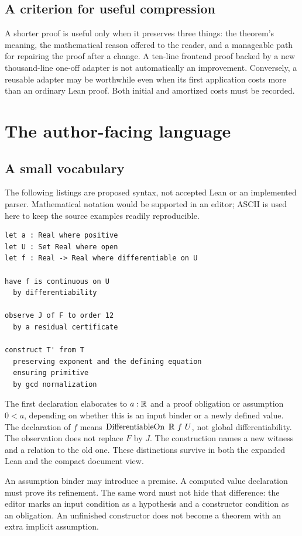 \documentclass[11pt,a4paper]{article}
\newcommand{\code}[1]{\texttt{\detokenize{#1}}}
\theoremstyle{plain}\newtheorem{proposition}{Proposition}[section]
\theoremstyle{definition}\newtheorem{definition}[proposition]{Definition}
\theoremstyle{remark}\newtheorem{remark}[proposition]{Remark}
\begin{document}
\subsection{A criterion for useful compression}
A shorter proof is useful only when it preserves three things: the theorem's meaning, the mathematical reason offered to the reader, and a manageable path for repairing the proof after a change. A ten-line frontend proof backed by a new thousand-line one-off adapter is not automatically an improvement. Conversely, a reusable adapter may be worthwhile even when its first application costs more than an ordinary Lean proof. Both initial and amortized costs must be recorded.

\section{The author-facing language}\label{sec:surface}
\subsection{A small vocabulary}
The following listings are proposed syntax, not accepted Lean or an implemented parser. Mathematical notation would be supported in an editor; ASCII is used here to keep the source examples readily reproducible.

\begin{lstlisting}
let a : Real where positive
let U : Set Real where open
let f : Real -> Real where differentiable on U

have f is continuous on U
  by differentiability

observe J of F to order 12
  by a residual certificate

construct T' from T
  preserving exponent and the defining equation
  ensuring primitive
  by gcd normalization
\end{lstlisting}

The first declaration elaborates to \(a:\mathbb R\) and a proof obligation or assumption \(0<a\), depending on whether this is an input binder or a newly defined value. The declaration of \(f\) means \(\operatorname{DifferentiableOn}\ \R\ f\ U\), not global differentiability. The observation does not replace \(F\) by \(J\). The construction names a new witness and a relation to the old one. These distinctions survive in both the expanded Lean and the compact document view.

An assumption binder may introduce a premise. A computed value declaration must prove its refinement. The same word \code{where} must not hide that difference: the editor marks an input condition as a hypothesis and a constructor condition as an obligation. An unfinished constructor does not become a theorem with an extra implicit assumption.
\end{document}
